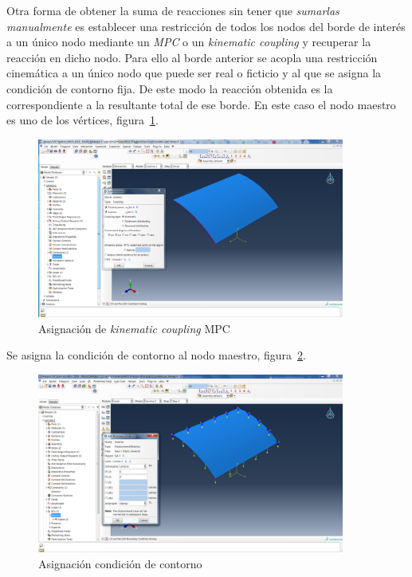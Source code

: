 \documentclass[spanish,a4paper,12pt]{article}
\begin{document}
Otra forma de obtener la suma de reacciones sin tener que \emph{sumarlas manualmente} es establecer una restricción de todos los nodos  del borde de interés a un único nodo mediante un \emph{MPC} o un \emph{kinematic coupling} y recuperar la reacción en dicho nodo.
Para ello al borde anterior se acopla una restricción cinemática a un único nodo que puede ser real o ficticio y al que se asigna la condición de contorno fija. 
De este modo la reacción obtenida es la correspondiente a la resultante total de ese borde. 
En este caso el nodo maestro es uno de los vértices, figura~\ref{fig:asig-kine-coup}.
\begin{figure}[!htp]
\centering
\includegraphics[width=0.9\textwidth]{fm/Fig-7_Kinematic_constraint.png}
\caption{Asignación de \emph{kinematic coupling} MPC}
\label{fig:asig-kine-coup}
\end{figure}

Se asigna la condición de contorno al nodo maestro, figura~\ref{fig:asig-cond-cont}.
\begin{figure}[!htp]
\centering
\includegraphics[width=0.9\textwidth]{fm/Fig-8_BC_Nodo_Maestro.png}
\caption{Asignación condición de contorno}
\label{fig:asig-cond-cont}
\end{figure}
\end{document}
